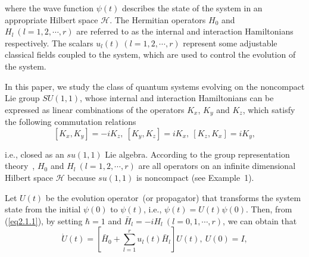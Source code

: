 \documentclass[onecolumn,showpacs,showkeys,preprintnumbers]{revtex4}
\begin{document}
\noindent where the wave function $\psi(t)$ describes the state of
the system in an appropriate Hilbert space $\mathcal{H}$. The
Hermitian operators $H_0$ and $H_l~(l=1,2,\cdots,r)$ are referred
to as the internal and interaction Hamiltonians respectively. The
scalars $u_l(t)~(l=1,2,\cdots,r)$ represent some adjustable
classical fields coupled to the system, which are used to control
the evolution of the system.

In this paper, we study the class of quantum systems evolving on
the noncompact Lie group $SU(1,1)$, whose internal and interaction
Hamiltonians can be expressed as linear combinations of the
operators $K_x$, $K_y$ and $K_z$, which satisfy the following
commutation
relations\noindent\begin{equation}\label{eq2.1.2}
[K_x,K_y]=-iK_z,~[K_y,K_z]=iK_x,~[K_z,K_x]=iK_y,
\end{equation}

\noindent i.e., closed as an $su(1,1)$ Lie algebra. According to
the group representation theory~\cite{Vilenkin1}, $H_0$ and
$H_l~(l=1,2,\cdots,r)$ are all operators on an infinite
dimensional Hilbert space $\mathcal{H}$ because $su(1,1)$ is
noncompact (see Example~1).

Let $U(t)$ be the evolution operator~(or propagator) that
transforms the system state from the initial $\psi(0)$ to
$\psi(t)$, i.e., $\psi(t)=U(t)\psi(0)$. Then, from
(\ref{eq2.1.1}), by setting $\hbar=1$ and
$\bar{H}_l=-iH_l~(l=0,1,\cdots,r)$, we can obtain that\noindent\begin{equation}\label{eq2.1.3}
\dot{U}(t)=\left[\bar{H}_0+\sum_{l=1}^{r}u_l(t)\bar{H}_l\right]U(t),~U(0)=I,
\end{equation}
\end{document}
